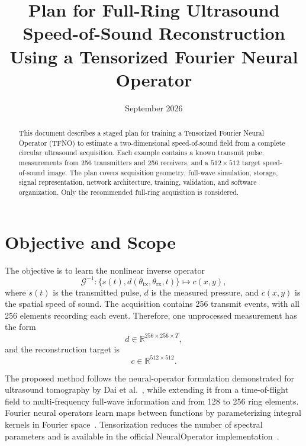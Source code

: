 \documentclass[11pt]{article}
\title{Plan for Full-Ring Ultrasound Speed-of-Sound Reconstruction\\
Using a Tensorized Fourier Neural Operator}
\author{}
\date{September 2026}
\begin{document}
\maketitle

\begin{abstract}
This document describes a staged plan for training a Tensorized Fourier
Neural Operator (TFNO) to estimate a two-dimensional speed-of-sound field from
a complete circular ultrasound acquisition. Each example contains a known
transmit pulse, measurements from 256 transmitters and 256 receivers, and a
$512\times512$ target speed-of-sound image. The plan covers acquisition
geometry, full-wave simulation, storage, signal representation, network
architecture, training, validation, and software organization. Only the
recommended full-ring acquisition is considered.
\end{abstract}

\section{Objective and Scope}

The objective is to learn the nonlinear inverse operator
\begin{equation}
  \mathcal{G}^{-1}:\{s(t),d(\theta_{\mathrm{tx}},
  \theta_{\mathrm{rx}},t)\}\longmapsto c(x,y),
\end{equation}
where $s(t)$ is the transmitted pulse, $d$ is the measured pressure, and
$c(x,y)$ is the spatial speed of sound. The acquisition contains 256 transmit
events, with all 256 elements recording each event. Therefore, one unprocessed
measurement has the form
\begin{equation}
  d\in\mathbb{R}^{256\times256\times T},
\end{equation}
and the reconstruction target is
\begin{equation}
  c\in\mathbb{R}^{512\times512}.
\end{equation}

The proposed method follows the neural-operator formulation demonstrated for
ultrasound tomography by Dai et al.~\cite{dai2023}, while extending it from a
time-of-flight field to multi-frequency full-wave information and from 128 to
256 ring elements. Fourier neural operators learn maps between functions by
parameterizing integral kernels in Fourier space~\cite{li2021,kovachki2023}.
Tensorization reduces the number of spectral parameters and is available in
the official NeuralOperator implementation~\cite{kossaifi2024}.
\end{document}
